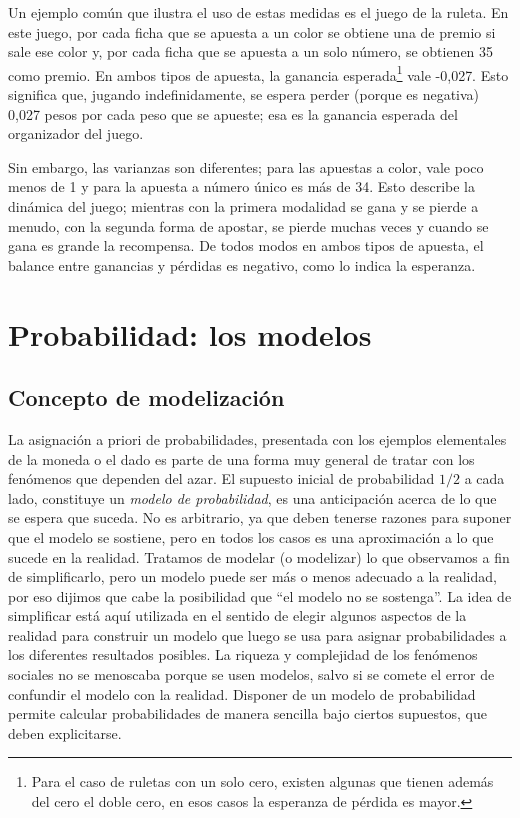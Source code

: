 \documentclass[]{book}
\let\rmarkdownfootnote\footnote%
\def\footnote{\protect\rmarkdownfootnote}
\begin{document}
Un ejemplo común que ilustra el uso de estas medidas es el juego de la
ruleta. En este juego, por cada ficha que se apuesta a un color se
obtiene una de premio si sale ese color y, por cada ficha que se apuesta
a un solo número, se obtienen 35 como premio. En ambos tipos de apuesta,
la ganancia esperada\footnote{Para el caso de ruletas con un solo cero, existen algunas que tienen además del cero el doble cero, en esos casos la esperanza de pérdida es mayor.} vale -0,027. Esto significa que, jugando
indefinidamente, se espera perder (porque es negativa) 0,027 pesos por
cada peso que se apueste; esa es la ganancia esperada del organizador
del juego.

Sin embargo, las varianzas son diferentes; para las apuestas a color,
vale poco menos de 1 y para la apuesta a número único es más de 34. Esto
describe la dinámica del juego; mientras con la primera modalidad se
gana y se pierde a menudo, con la segunda forma de apostar, se pierde
muchas veces y cuando se gana es grande la recompensa. De todos modos en
ambos tipos de apuesta, el balance entre ganancias y pérdidas es
negativo, como lo indica la esperanza.

\hypertarget{probabilidad-los-modelos}{%
\chapter{Probabilidad: los modelos}\label{probabilidad-los-modelos}}

\hypertarget{concepto-de-modelizaciuxf3n}{%
\section{Concepto de modelización}\label{concepto-de-modelizaciuxf3n}}

La asignación a priori de probabilidades, presentada con los ejemplos
elementales de la moneda o el dado es parte de una forma muy general de
tratar con los fenómenos que dependen del azar. El supuesto inicial de
probabilidad \(1/2\) a cada lado, constituye un \emph{modelo de probabilidad}, es
una anticipación acerca de lo que se espera que suceda. No es
arbitrario, ya que deben tenerse razones para suponer que el modelo se
sostiene, pero en todos los casos es una aproximación a lo que sucede en
la realidad. Tratamos de modelar (o modelizar) lo que observamos a fin
de simplificarlo, pero un modelo puede ser más o menos adecuado a la
realidad, por eso dijimos que cabe la posibilidad que ``el modelo no se
sostenga''. La idea de simplificar está aquí utilizada en el sentido de
elegir algunos aspectos de la realidad para construir un modelo que
luego se usa para asignar probabilidades a los diferentes resultados
posibles. La riqueza y complejidad de los fenómenos sociales no se
menoscaba porque se usen modelos, salvo si se comete el error de
confundir el modelo con la realidad. Disponer de un modelo de
probabilidad permite calcular probabilidades de manera sencilla bajo
ciertos supuestos, que deben explicitarse.
\end{document}
